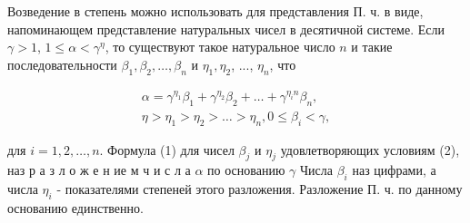 \documentclass[10pt]{article}
\begin{document}
Возведение в степень можно использовать для представления П. ч. в виде, напоминающем представление натуральных чисел в десятичной системе. Если $\gamma>1$, $1 \leqslant \alpha<\gamma^{\eta}$, то существуют такое натуральное число $n$ и такие последовательности $\beta_{1}, \beta_{2}, \ldots, \beta_{n}$ и $\eta_{1}, \eta_{2}$, ..., $\eta_{n}$, что



\[

\begin{gathered}

\alpha=\gamma^{\eta_{1}} \beta_{1}+\gamma^{\eta_{2}} \beta_{2}+\ldots+\gamma^{\eta_{i} n} \beta_{n}, \\

\eta>\eta_{1}>\eta_{2}>\ldots>\eta_{n}, 0 \leqslant \beta_{i}<\gamma,

\end{gathered}

\]



для $i=1,2, \ldots, n$. Формула (1) для чисел $\beta_{j}$ и $\eta_{j}$ удовлетворяющих условиям (2), наз р а з л о ж е н ие м ч и с л а $\alpha$ по основанию $\gamma$ Числа $\beta_{i}$ наз цифрами, а числа $\eta_{i}$ - показателями степеней этого разложения. Разложение П. ч. по данному основанию единственно.
\end{document}
